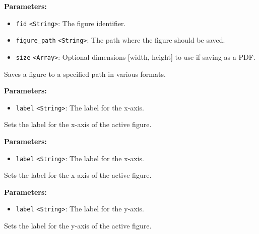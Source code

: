 \documentclass[12pt,a4paper]{article}
\begin{document}
\noindent \textbf{Parameters:}
\begin{itemize}
  \item \texttt{fid} \texttt{<String>}: The figure identifier.
  \item \texttt{figure\_path} \texttt{<String>}: The path where the figure should be saved.
  \item \texttt{size} \texttt{<Array>}: Optional dimensions [width, height] to use if saving as a PDF.
\end{itemize}

\noindent Saves a figure to a specified path in various formats.

\vspace{5mm}
\noindent {}


\noindent \textbf{Parameters:}
\begin{itemize}
  \item \texttt{label} \texttt{<String>}: The label for the x-axis.
\end{itemize}

\noindent Sets the label for the x-axis of the active figure.

\vspace{5mm}
\noindent {}


\noindent \textbf{Parameters:}
\begin{itemize}
  \item \texttt{label} \texttt{<String>}: The label for the x-axis.
\end{itemize}

\noindent Sets the label for the x-axis of the active figure.

\vspace{5mm}
\noindent {}


\noindent \textbf{Parameters:}
\begin{itemize}
  \item \texttt{label} \texttt{<String>}: The label for the y-axis.
\end{itemize}

\noindent Sets the label for the y-axis of the active figure.
\end{document}
